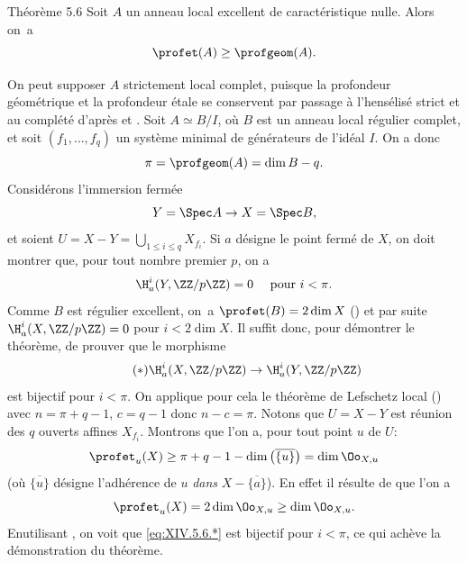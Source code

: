 \label{XIV.5.6}
\begin{enonce*}{Th\'eor\`eme 5.6\ndemark}
Soit $A$ un anneau local excellent de caract\'eristique nulle. Alors on~a
$$
\profet(A)\geq\profgeom(A).
$$
\end{enonce*}

On peut supposer $A$ strictement local complet, puisque la profondeur g\'eom\'etrique et la profondeur \'etale se conservent par passage \`a l'hens\'elis\'e strict et au compl\'et\'e d'apr\`es  et . Soit $A\simeq B/I$, o\`u $B$ est un anneau local r\'egulier complet, et soit $(f_{1},\dots, f_{q})$ un syst\`eme minimal de g\'en\'erateurs de l'id\'eal $I$. On a donc\pageoriginale
$$
\pi=\profgeom(A)=\dim B-q.
$$
Consid\'erons l'immersion ferm\'ee
$$Y=\Spec A\to X=\Spec B,
$$
et soient $U=X-Y=\bigcup_{1\leq i\leq q}X_{f_{i}}$. Si $a$ d\'esigne le point ferm\'e de $X$, on doit montrer que, pour tout nombre premier $p$, on a
$$
\H_{a}^{i}(Y, \ZZ/p\ZZ)=0\quad\textrm{ pour }i<\pi.
$$
Comme $B$ est r\'egulier excellent, on~a $\profet(B)=2\dim X$ (\cf {}) et par suite $\H_{a}^{i}(X, \ZZ/p\ZZ)=0$ pour $i<2\dim X$. Il suffit donc, pour d\'emontrer le th\'eor\`eme, de prouver que le morphisme
\begin{equation*} \label{eq:XIV.5.6.*} \tag{$*$}
\H_{a}^{i}(X, \ZZ/p\ZZ)\to\H_{a}^{i}(Y, \ZZ/p\ZZ)
\end{equation*}
est bijectif pour $i<\pi$. On applique pour cela le th\'eor\`eme de Lefschetz local () avec $n=\pi+q-1$, $c=q-1$ donc $n-c=\pi$. Notons que $U=X-Y$ est r\'eunion des $q$ ouverts affines $X_{f_{i}}$. Montrons que l'on a, pour tout point $u$ de $U$:
$$
\profet_{u}(X)\geq\pi+q-1-\dim\big(\overline{\{ u\} }\big)=\dim\Oo_{X, u}$$
(o\`u $\overline{\{ u\} }$ d\'esigne l'adh\'erence de $u$ \emph{dans} $X-\overline{\{ a\} }$). En effet il r\'esulte de  que l'on a
$$
\profet_{u}(X)=2\dim\Oo_{X, u}\geq\dim\Oo_{X, u}.
$$
En\pageoriginaled utilisant , on voit que \eqref{eq:XIV.5.6.*} est bijectif pour $i<\pi$, ce qui ach\`eve la d\'emonstration du th\'eor\`eme.

